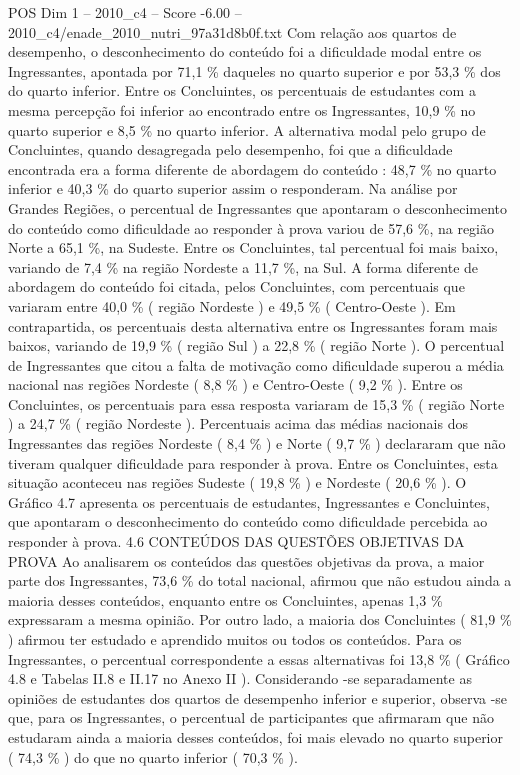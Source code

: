 \begin{textsample}{POS Dim 1 – 2010\_c4 – Score -6.00 – 2010\_c4/enade\_2010\_nutri\_97a31d8b0f.txt}
Com relação aos quartos de desempenho, o desconhecimento do conteúdo foi a dificuldade modal entre os Ingressantes, apontada por 71,1 \% daqueles no quarto superior e por 53,3 \% dos do quarto inferior.
Entre os Concluintes, os percentuais de estudantes com a mesma percepção foi inferior ao encontrado entre os Ingressantes, 10,9 \% no quarto superior e 8,5 \% no quarto inferior.
A alternativa modal pelo grupo de Concluintes, quando desagregada pelo desempenho, foi que a dificuldade encontrada era a forma diferente de abordagem do conteúdo : 48,7 \% no quarto inferior e 40,3 \% do quarto superior assim o responderam.
Na análise por Grandes Regiões, o percentual de Ingressantes que apontaram o desconhecimento do conteúdo como dificuldade ao responder à prova variou de 57,6 \%, na região Norte a 65,1 \%, na Sudeste.
Entre os Concluintes, tal percentual foi mais baixo, variando de 7,4 \% na região Nordeste a 11,7 \%, na Sul.
A forma diferente de abordagem do conteúdo foi citada, pelos Concluintes, com percentuais que variaram entre 40,0 \% ( região Nordeste ) e 49,5 \% ( Centro-Oeste ).
Em contrapartida, os percentuais desta alternativa entre os Ingressantes foram mais baixos, variando de 19,9 \% ( região Sul ) a 22,8 \% ( região Norte ).
O percentual de Ingressantes que citou a falta de motivação como dificuldade superou a média nacional nas regiões Nordeste ( 8,8 \% ) e Centro-Oeste ( 9,2 \% ).
Entre os Concluintes, os percentuais para essa resposta variaram de 15,3 \% ( região Norte ) a 24,7 \% ( região Nordeste ).
Percentuais acima das médias nacionais dos Ingressantes das regiões Nordeste ( 8,4 \% ) e Norte ( 9,7 \% ) declararam que não tiveram qualquer dificuldade para responder à prova.
Entre os Concluintes, esta situação aconteceu nas regiões Sudeste ( 19,8 \% ) e Nordeste ( 20,6 \% ).
O Gráfico 4.7 apresenta os percentuais de estudantes, Ingressantes e Concluintes, que apontaram o desconhecimento do conteúdo como dificuldade percebida ao responder à prova. 4.6 CONTEÚDOS DAS QUESTÕES OBJETIVAS DA PROVA Ao analisarem os conteúdos das questões objetivas da prova, a maior parte dos Ingressantes, 73,6 \% do total nacional, afirmou que não estudou ainda a maioria desses conteúdos, enquanto entre os Concluintes, apenas 1,3 \% expressaram a mesma opinião.
Por outro lado, a maioria dos Concluintes ( 81,9 \% ) afirmou ter estudado e aprendido muitos ou todos os conteúdos.
Para os Ingressantes, o percentual correspondente a essas alternativas foi 13,8 \% ( Gráfico 4.8 e Tabelas II.8 e II.17 no Anexo II ).
Considerando -se separadamente as opiniões de estudantes dos quartos de desempenho inferior e superior, observa -se que, para os Ingressantes, o percentual de participantes que afirmaram que não estudaram ainda a maioria desses conteúdos, foi mais elevado no quarto superior ( 74,3 \% ) do que no quarto inferior ( 70,3 \% ).

\end{textsample}
